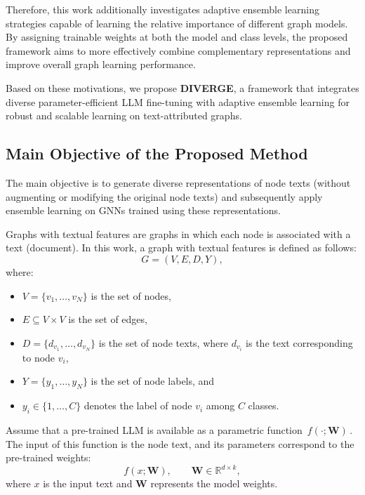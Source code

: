 \documentclass[a4paper,fleqn]{cas-sc}
\begin{document}
Therefore, this work additionally investigates adaptive ensemble learning strategies capable of learning the relative importance of different graph models. By assigning trainable weights at both the model and class levels, the proposed framework aims to more effectively combine complementary representations and improve overall graph learning performance.

Based on these motivations, we propose \textbf{DIVERGE}, a framework that integrates diverse parameter-efficient LLM fine-tuning with adaptive ensemble learning for robust and scalable learning on text-attributed graphs.




\subsection{Main Objective of the Proposed Method}
The main objective is to generate diverse representations of node texts (without augmenting or modifying the original node texts) and subsequently apply ensemble learning on GNNs trained using these representations.

Graphs with textual features are graphs in which each node is associated with a text (document). In this work, a graph with textual features is defined as follows:
\begin{equation}
G = (V, E, D, Y),
\end{equation}
where:
\begin{itemize}
\item $V=\{v_1,\dots,v_N\}$ is the set of nodes,
\item $E \subseteq V\times V$ is the set of edges,
\item $D=\{d_{v_1},\dots,d_{v_N}\}$ is the set of node texts, where $d_{v_i}$ is the text corresponding to node $v_i$,
\item $Y=\{y_1,\dots,y_N\}$ is the set of node labels, and
\item $y_i \in \{1,\dots,C\}$ denotes the label of node $v_i$ among $C$ classes.
\end{itemize}

Assume that a pre-trained LLM is available as a parametric function $\,f(\cdot;\mathbf{W})\,$. The input of this function is the node text, and its parameters correspond to the pre-trained weights:
\begin{equation}
f(x;\mathbf{W}), \qquad \mathbf{W}\in\mathbb{R}^{d\times k},
\end{equation}
where $x$ is the input text and $\mathbf{W}$ represents the model weights.
\end{document}
